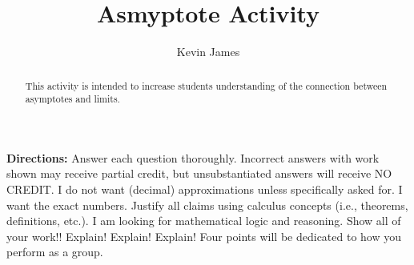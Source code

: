 \documentclass[handout,nooutcomes,noauthor]{Ximera}
\author{Kevin James}
\title{Asmyptote Activity}
\begin{document}
	\begin{abstract}
		This activity is intended to increase students understanding of the connection between asymptotes and limits.
	\end{abstract}
	\maketitle
	\textbf{Directions:}  Answer each question thoroughly.  Incorrect answers with work shown may receive partial credit, but unsubstantiated answers will receive NO CREDIT.  I do not want (decimal) approximations unless specifically asked for.  I want the exact numbers.  Justify all claims using calculus concepts (i.e., theorems, definitions, etc.).  I am looking for mathematical logic and reasoning.  Show all of your work!! Explain!  Explain!  Explain!  Four points will be dedicated to how you perform as a group.
	\vspace{5mm}
	
\end{document}
